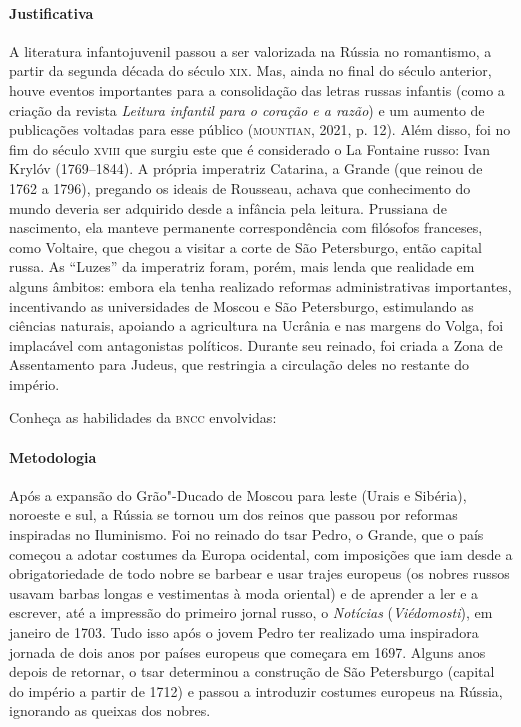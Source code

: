 \documentclass[11pt]{extarticle}
\begin{document}
\paragraph{Justificativa}
A literatura infantojuvenil passou a ser valorizada na Rússia no
romantismo, a partir da segunda década do século \textsc{xix}. Mas, ainda no
final do século anterior, houve eventos importantes para a consolidação
das letras russas infantis (como a criação da revista \emph{Leitura
infantil para o coração e a razão}) e um aumento de publicações voltadas
para esse público (\textsc{mountian}, 2021, p. 12). Além disso, foi no fim do
século \textsc{xviii} que surgiu este que é considerado o La Fontaine russo: Ivan
Krylóv (1769--1844). A própria imperatriz Catarina, a Grande (que reinou
de 1762 a 1796), pregando os ideais de Rousseau, achava que conhecimento
do mundo deveria ser adquirido desde a infância pela leitura. Prussiana
de nascimento, ela manteve permanente correspondência com filósofos
franceses, como Voltaire, que chegou a visitar a corte de São
Petersburgo, então capital russa. As ``Luzes'' da imperatriz foram, porém,
mais lenda que realidade em alguns âmbitos: embora ela tenha realizado
reformas administrativas importantes, incentivando as universidades de
Moscou e São Petersburgo, estimulando as ciências naturais, apoiando a
agricultura na Ucrânia e nas margens do Volga, foi implacável com
antagonistas políticos. Durante seu reinado, foi criada a Zona de
Assentamento para Judeus, que restringia a circulação deles no restante
do império.


Conheça as habilidades da \textsc{bncc} envolvidas:

\paragraph{Metodologia}
Após a expansão do Grão"-Ducado de Moscou para leste (Urais e Sibéria),
noroeste e sul, a Rússia se tornou um dos reinos que passou por reformas
inspiradas no Iluminismo. Foi no reinado do tsar Pedro, o Grande, que o
país começou a adotar costumes da Europa ocidental, com imposições que
iam desde a obrigatoriedade de todo nobre se barbear e usar trajes
europeus (os nobres russos usavam barbas longas e vestimentas à moda
oriental) e de aprender a ler e a escrever, até a impressão do primeiro
jornal russo, o \emph{Notícias} (\emph{Viédomosti}), em janeiro de 1703.
Tudo isso após o jovem Pedro ter realizado uma inspiradora jornada de
dois anos por países europeus que começara em 1697. Alguns anos depois
de retornar, o tsar determinou a construção de São Petersburgo (capital
do império a partir de 1712) e passou a introduzir costumes europeus na
Rússia, ignorando as queixas dos nobres.
\end{document}
